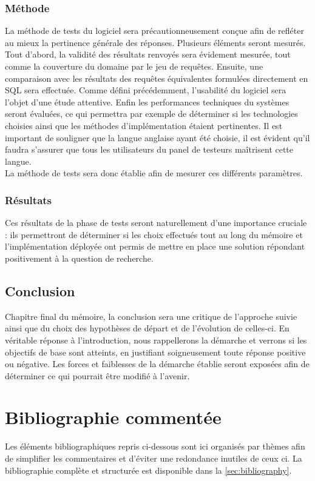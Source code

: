 \documentclass[a4paper,12pt]{article}
\begin{document}
\subsubsection{Méthode}
La méthode de tests du logiciel sera précautionneusement conçue afin de refléter au mieux la pertinence générale des réponses. Plusieurs éléments seront mesurés. Tout d'abord, la validité des résultats renvoyés sera évidement mesurée, tout comme la couverture du domaine par le jeu de requêtes. Ensuite, une comparaison avec les résultats des requêtes équivalentes formulées directement en SQL sera effectuée. Comme défini précédemment, l'usabilité du logiciel sera l'objet d'une étude attentive. Enfin les performances techniques du systèmes seront évaluées, ce qui permettra par exemple de déterminer si les technologies choisies ainsi que les méthodes d'implémentation étaient pertinentes.
Il est important de souligner que la langue anglaise ayant été choisie, il est évident qu'il faudra s'assurer que tous les utilisateurs du panel de testeurs maîtrisent cette langue. \\

La méthode de tests sera donc établie afin de mesurer ces différents paramètres.
\subsubsection{Résultats}
Ces résultats de la phase de tests seront naturellement d'une importance cruciale : ils permettront de déterminer si les choix effectués tout au long du mémoire et l'implémentation déployée ont permis de mettre en place une solution répondant positivement à la question de recherche.
\subsection{Conclusion}
Chapitre final du mémoire, la conclusion sera une critique de l'approche suivie ainsi que du choix des hypothèses de départ et de l'évolution de celles-ci.
En véritable réponse à l'introduction, nous rappellerons la démarche et verrons si les objectifs de base sont atteints, en justifiant soigneusement toute réponse positive ou négative.
Les forces et faiblesses de la démarche établie seront exposées afin de déterminer ce qui pourrait être modifié à l'avenir.
\newpage
\section{Bibliographie commentée}
Les éléments bibliographiques repris ci-dessous sont ici organisés par thèmes afin de simplifier les commentaires et d'éviter une redondance inutiles de ceux ci. La bibliographie complète et structurée est disponible dans la \autoref{sec:bibliography}.
\end{document}
